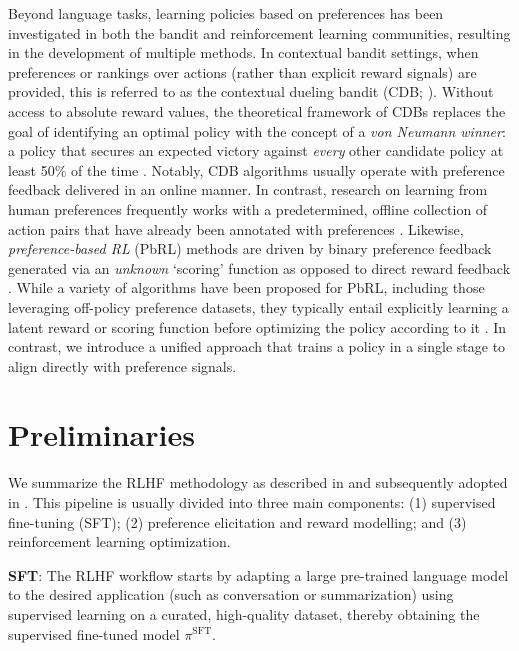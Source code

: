 Beyond language tasks, learning policies based on preferences has been investigated in both the bandit and reinforcement learning communities, resulting in the development of multiple methods. In contextual bandit settings, when preferences or rankings over actions (rather than explicit reward signals) are provided, this is referred to as the contextual dueling bandit (CDB; \cite{yue2012karmed,dudik2015contextual}). Without access to absolute reward values, the theoretical framework of CDBs replaces the goal of identifying an optimal policy with the concept of a \textit{von Neumann winner}: a policy that secures an expected victory against \textit{every} other candidate policy at least 50\% of the time \citep{dudik2015contextual}. Notably, CDB algorithms usually operate with preference feedback delivered in an online manner. In contrast, research on learning from human preferences frequently works with a predetermined, offline collection of action pairs that have already been annotated with preferences \citep{yan2022human}. Likewise, \textit{preference-based RL} (PbRL) methods are driven by binary preference feedback generated via an \textit{unknown} `scoring' function as opposed to direct reward feedback \citep{BusaFekete2014,ruiz2023dueling}. While a variety of algorithms have been proposed for PbRL, including those leveraging off-policy preference datasets, they typically entail explicitly learning a latent reward or scoring function before optimizing the policy according to it \citep{jain2013learning,BusaFekete2014,christiano2017deep,sadigh2017active,kupcsik2018learning}. In contrast, we introduce a unified approach that trains a policy in a single stage to align directly with preference signals.

\section{Preliminaries}\label{section:prelims}

We summarize the RLHF methodology as described in \citeauthor{ziegler2020finetuning} and subsequently adopted in \citep{stiennon2022learning, bai2022training, ouyang2022training}. This pipeline is usually divided into three main components: (1) supervised fine-tuning (SFT); (2) preference elicitation and reward modelling; and (3) reinforcement learning optimization.

\textbf{SFT}: The RLHF workflow starts by adapting a large pre-trained language model to the desired application (such as conversation or summarization) using supervised learning on a curated, high-quality dataset, thereby obtaining the supervised fine-tuned model $\pi^\text{SFT}$.

